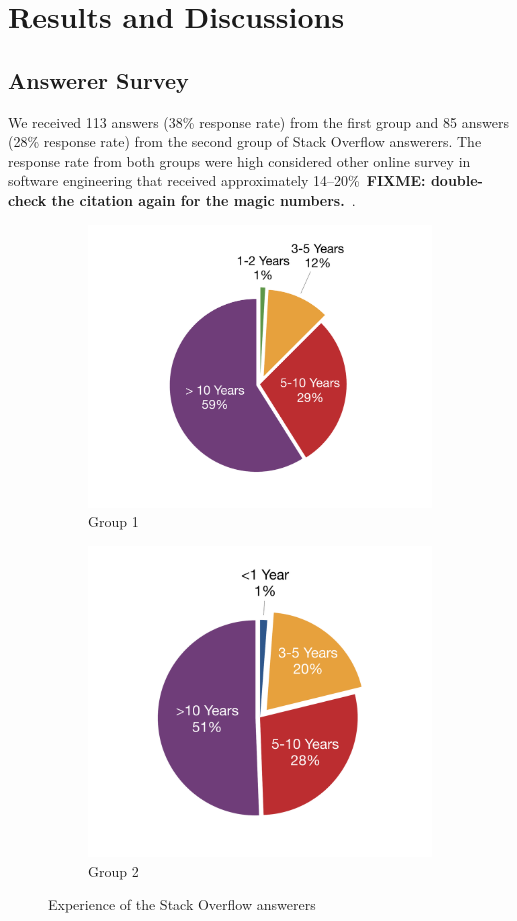 \documentclass{svjour3}                     %
\newcommand\FIXME[1]{\textbf{FIXME: #1}}
\begin{document}
\section{Results and Discussions}

\subsection{Answerer Survey}
We received 113 answers (38\% response rate) from the first group and 85 answers
(28\% response rate) from the second group of Stack Overflow answerers. The response
rate from both groups were high considered other online survey in software
engineering that received approximately 14--20\%~\FIXME{double-check the
	citation again for the magic numbers.}~\citep{Punter2003}.

\begin{figure}
	\begin{subfigure}{.5\textwidth}
		\centering
		\includegraphics[width=0.5\linewidth]{survey_exp_1-crop}
		\caption{Group 1}
		\label{fig:survey_group1_exp}
	\end{subfigure}%
	\begin{subfigure}{.5\textwidth}
		\centering
		\includegraphics[width=0.5\linewidth]{survey_exp_2-crop}
		\caption{Group 2}
		\label{fig:survey_group2_exp}
	\end{subfigure}
	\caption{Experience of the Stack Overflow answerers}
	\label{fig:survey_exp}
\end{figure}
\end{document}

